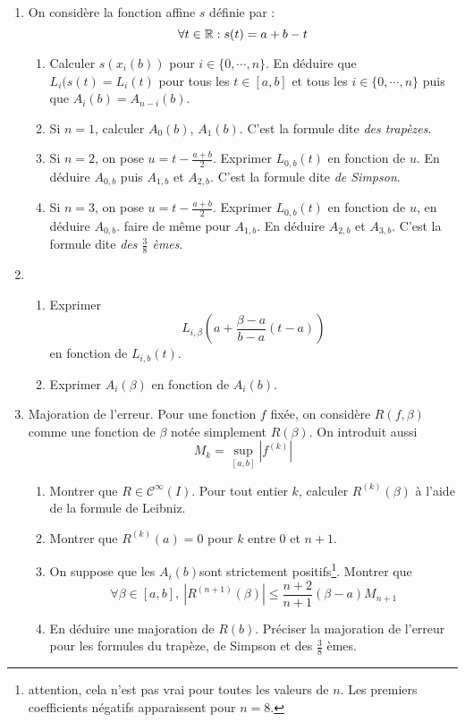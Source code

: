 \begin{enumerate}
\begin{enumerate}
\end{enumerate}
\item On considère la fonction affine $s$ définie par :
\begin{displaymath}
 \forall t\in \mathbb{R} : s(t)=a+b-t
\end{displaymath}
\begin{enumerate}
\item Calculer $s(x_i(b))$ pour $i\in\{0,\cdots,n\}$. En déduire que $L_i(s(t)=L_i(t)$ pour tous les $t\in[a,b]$ et tous les $i\in\{0,\cdots,n\}$ puis que $A_i(b)=A_{n-i}(b)$.
\item Si $n=1$, calculer $A_0(b)$, $A_1(b)$. C'est la formule dite \emph{des trapèzes}.
\item Si $n=2$, on pose $u=t-\frac{a+b}{2}$. Exprimer $L_{0,b}(t)$ en fonction de $u$. En déduire $A_{0,b}$ puis $A_{1,b}$ et $A_{2,b}$. C'est la formule dite \emph{de Simpson}.
\item Si $n=3$, on pose $u=t-\frac{a+b}{2}$. Exprimer $L_{0,b}(t)$ en fonction de $u$, en déduire $A_{0,b}$. faire de même pour $A_{1,b}$. En déduire $A_{2,b}$ et $A_{3,b}$. C'est la formule dite \emph{des $\frac{3}{8}$ èmes}.
\end{enumerate}
\item \begin{enumerate}
\item Exprimer
\[L_{i,\beta}(a+\frac{\beta - a}{b-a}(t-a))\]
en fonction de $L_{i,b}(t)$.
\item Exprimer $A_i(\beta)$ en fonction de $A_i(b)$.
      \end{enumerate}
\item Majoration de l'erreur.\newline
Pour une fonction $f$ fixée, on considère $R(f,\beta)$ comme une fonction de $\beta$ notée simplement $R(\beta)$. On introduit aussi
\[M_k=\sup_{[a,b]}|f^{(k)}| \]
\begin{enumerate}
\item Montrer que $R\in \mathcal{C}^{\infty}(I)$. Pour tout entier $k$, calculer $R^{(k)}(\beta)$ à l'aide de la formule de Leibniz.
\item Montrer que $R^{(k)}(a)=0$ pour $k$ entre 0 et $n+1$.
\item On suppose que les $A_i(b)$sont strictement positifs\footnote{attention, cela n'est pas vrai pour toutes les valeurs de $n$. Les premiers coefficients négatifs apparaissent pour $n=8$.}. Montrer que
\begin{displaymath}
\forall \beta\in[a,b], \: |R^{(n+1)}(\beta)|\leq \frac{n+2}{n+1}(\beta -a)M_{n+1} 
\end{displaymath}

\item En déduire une majoration de $R(b)$. Préciser la majoration de l'erreur pour les formules du trapèze, de Simpson et des $\frac{3}{8}$ èmes.
\end{enumerate}
\end{enumerate} 